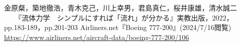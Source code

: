 \begin{thebibliography}{99}
     金原粲，築地徹浩，青木克己，川上幸男，君島真仁，桜井康雄，清水誠二
    　　『流体力学　シンプルにすれば「流れ」が分かる』実教出版，2022， pp.183-189，pp.201-203   
     Airliners.net『Boeing 777-200』(2024/7/16閲覧) \\
    \url{https://www.airliners.net/aircraft-data/boeing-777-200/106}
\end{thebibliography}
